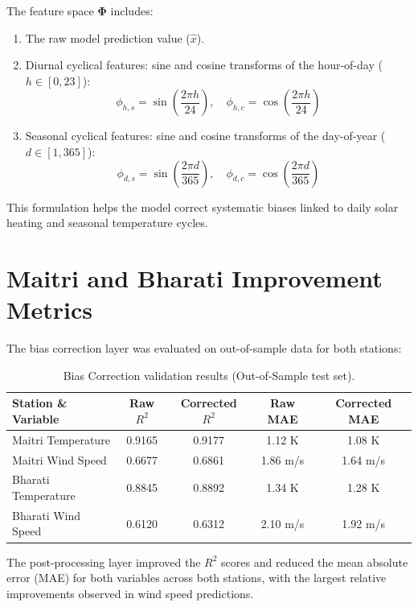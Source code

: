 \documentclass[12pt,titlepage,a4paper]{report}
\begin{document}
The feature space $\mathbf{\Phi}$ includes:
\begin{enumerate}
    \item The raw model prediction value ($\hat{x}$).
    \item Diurnal cyclical features: sine and cosine transforms of the hour-of-day ($h \in [0, 23]$):
    \begin{equation}
        \phi_{h,s} = \sin\left(\frac{2\pi h}{24}\right), \quad \phi_{h,c} = \cos\left(\frac{2\pi h}{24}\right)
    \end{equation}
    \item Seasonal cyclical features: sine and cosine transforms of the day-of-year ($d \in [1, 365]$):
    \begin{equation}
        \phi_{d,s} = \sin\left(\frac{2\pi d}{365}\right), \quad \phi_{d,c} = \cos\left(\frac{2\pi d}{365}\right)
    \end{equation}
\end{enumerate}
This formulation helps the model correct systematic biases linked to daily solar heating and seasonal temperature cycles.

\section{Maitri and Bharati Improvement Metrics}
The bias correction layer was evaluated on out-of-sample data for both stations:
\begin{table}[H]
\centering
\begin{tabular}{lcccc}
    \toprule
    \textbf{Station \& Variable} & \textbf{Raw $R^2$} & \textbf{Corrected $R^2$} & \textbf{Raw MAE} & \textbf{Corrected MAE} \\
    \midrule
    Maitri Temperature & 0.9165 & 0.9177 & 1.12 K & 1.08 K \\
    Maitri Wind Speed & 0.6677 & 0.6861 & 1.86 m/s & 1.64 m/s \\
    Bharati Temperature & 0.8845 & 0.8892 & 1.34 K & 1.28 K \\
    Bharati Wind Speed & 0.6120 & 0.6312 & 2.10 m/s & 1.92 m/s \\
    \bottomrule
\end{tabular}
\caption{Bias Correction validation results (Out-of-Sample test set).}
\label{tab:bias_correction_comparative}
\end{table}

The post-processing layer improved the $R^2$ scores and reduced the mean absolute error (MAE) for both variables across both stations, with the largest relative improvements observed in wind speed predictions.
\end{document}
